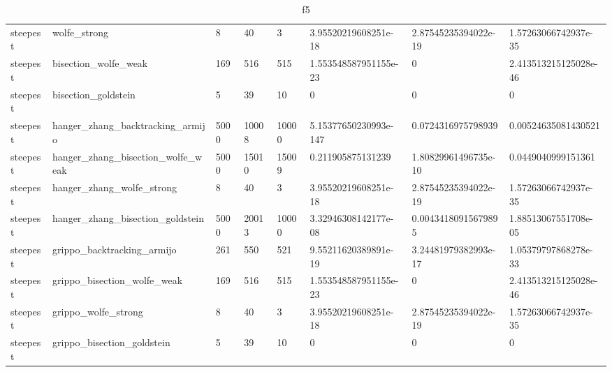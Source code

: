 \documentclass[a4paper,11pt]{article}
\numberwithin{equation}{section} %
\begin{document}
\begin{table}[h!]
{\begin{tabular}{|l|l|l|l|l|l|l|l|}
        steepest & wolfe\_strong & 8 & 40 & 3 & 3.95520219608251e-18 & 2.87545235394022e-19 & 1.57263066742937e-35 \\
        steepest & bisection\_wolfe\_weak & 169 & 516 & 515 & 1.553548587951155e-23 & 0 & 2.413513215125028e-46 \\
        steepest & bisection\_goldstein & 5 & 39 & 10 & 0 & 0 & 0 \\
        steepest & hanger\_zhang\_backtracking\_armijo & 5000 & 10008 & 10000 & 5.15377650230993e-147 & 0.0724316975798939 & 0.00524635081430521 \\
        steepest & hanger\_zhang\_bisection\_wolfe\_weak & 5000 & 15010 & 15009 & 0.211905875131239 & 1.80829961496735e-10 & 0.0449040999151361 \\
        steepest & hanger\_zhang\_wolfe\_strong & 8 & 40 & 3 & 3.95520219608251e-18 & 2.87545235394022e-19 & 1.57263066742937e-35 \\
        steepest & hanger\_zhang\_bisection\_goldstein & 5000 & 20013 & 10000 & 3.32946308142177e-08 & 0.00434180915679895 & 1.88513067551708e-05 \\
        steepest & grippo\_backtracking\_armijo & 261 & 550 & 521 & 9.55211620389891e-19 & 3.24481979382993e-17 & 1.05379797868278e-33 \\
        steepest & grippo\_bisection\_wolfe\_weak & 169 & 516 & 515 & 1.553548587951155e-23 & 0 & 2.413513215125028e-46 \\
        steepest & grippo\_wolfe\_strong & 8 & 40 & 3 & 3.95520219608251e-18 & 2.87545235394022e-19 & 1.57263066742937e-35 \\
        steepest & grippo\_bisection\_goldstein & 5 & 39 & 10 & 0 & 0 & 0 \\
\end{tabular}}
\caption{f5}
\label{table:f5}
\end{table}
\end{document}
